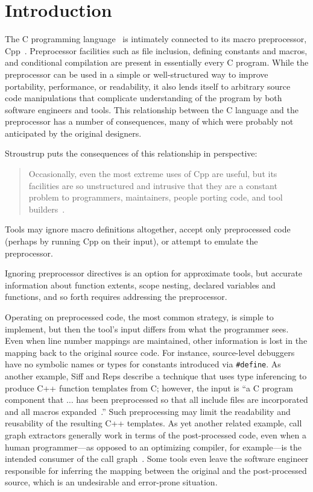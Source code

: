 \bigskip

\section{Introduction}

The C programming language~\cite{ansi} is intimately connected to its macro
preprocessor, Cpp~\cite[Ch.3]{Harbison91}.  Preprocessor facilities such as
file inclusion, defining constants and macros, and conditional compilation
are present in essentially every C program.   
While the preprocessor can be used in a simple or well-structured way to
improve portability, performance, or readability, it also lends itself to 
arbitrary source code manipulations that complicate understanding of the
program by both software engineers and tools.
This relationship
between the C language and the preprocessor has a number of consequences,
many of which were probably not anticipated by the original designers.

Stroustrup puts the consequences of this relationship in perspective:
\begin{quote}
Occasionally, even the most extreme uses of Cpp are useful, but its
facilities are so unstructured and intrusive that they are a constant
problem to programmers, maintainers, people porting code, and tool
builders~\cite[p.~424]{Stroustrup-DesignEvolution}.
\end{quote}

Tools may ignore macro definitions altogether, accept only preprocessed
code (perhaps by running Cpp on their input), or attempt to emulate the
preprocessor.

Ignoring preprocessor directives is an option for approximate tools, but
accurate information about function extents, scope nesting, declared
variables and functions, and so forth requires addressing the preprocessor.

Operating on preprocessed code, the most common strategy, is simple to
implement, but then the tool's input differs from what the
programmer sees.  Even when line number mappings are maintained, other
information is lost in the mapping back to the original source code.
For instance, source-level debuggers have no symbolic names or types
for constants introduced via \verb|#define|.  As another example, Siff
and Reps describe a technique that uses type inferencing to produce
C++ function templates from C; however, the input is ``a C program
component that $\ldots$ has been preprocessed so that all include
files are incorporated and all macros
expanded~\cite[p.~145]{Siff-fse96}.''  Such preprocessing may limit
the readability and reusability of the resulting C++ templates.  As
yet another related example, call graph extractors generally work in
terms of the post-processed code, even when a human programmer---as
opposed to an optimizing compiler, for example---is the intended
consumer of the call graph~\cite{Murphy-icse18}.  Some tools even
leave the software engineer responsible for inferring the mapping between the
original and the post-processed source, which is an undesirable and
error-prone situation.

